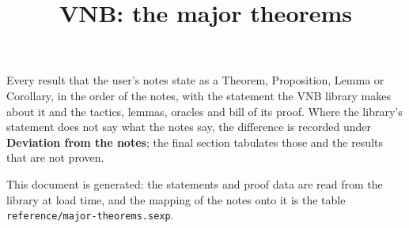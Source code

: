 \documentclass[11pt]{article}
\title{VNB: the major theorems}
\author{}
\date{}
\begin{document}
\maketitle

\noindent
Every result that the user's notes state as a Theorem, Proposition, Lemma or
Corollary, in the order of the notes, with the statement the VNB library makes
about it and the tactics, lemmas, oracles and bill of its proof.  Where the
library's statement does not say what the notes say, the difference is recorded
under \textbf{Deviation from the notes}; the final section tabulates those and
the results that are not proven.

\medskip
\noindent
This document is generated: the statements and proof data are read from the
library at load time, and the mapping of the notes onto it is the table
\texttt{reference/major-theorems.sexp}.

\tableofcontents


\end{document}
